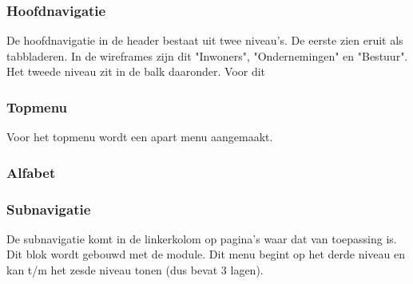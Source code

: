 
\subsubsection{Hoofdnavigatie}

De hoofdnavigatie in de header bestaat uit twee niveau's. De eerste zien eruit als tabbladeren. In de wireframes zijn dit "Inwoners", "Ondernemingen" en "Bestuur". Het tweede niveau zit in de balk daaronder. Voor dit 

\subsubsection{Topmenu}

Voor het topmenu wordt een apart menu aangemaakt.

\subsubsection{Alfabet}

\subsubsection{Subnavigatie}

De subnavigatie komt in de linkerkolom op pagina's waar dat van toepassing is. Dit blok wordt gebouwd met de  module. Dit menu begint op het derde niveau en kan t/m het zesde niveau tonen (dus bevat 3 lagen).